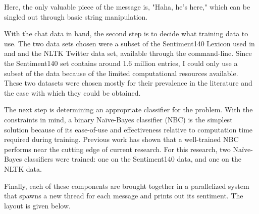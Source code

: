\documentclass[12pt]{article}
\begin{document}
Here, the only valuable piece of the message is, "Haha, he's here," which can be singled out through basic string manipulation. 

With the chat data in hand, the second step is to decide what training data to use. The two data sets chosen were a subset of the Sentiment140 Lexicon used in \cite{go2009twitter} and \cite{MohammadKZ2013} and the NLTK Twitter data set, available through the command-line. Since the Sentiment140 set contains around 1.6 million entries, I could only use a subset of the data because of the limited computational resources available. These two datasets were chosen mostly for their prevalence in the literature and the ease with which they could be obtained.

The next step is determining an appropriate classifier for the problem. With the constraints in mind, a binary Naïve-Bayes classifier (NBC) is the simplest solution because of its ease-of-use and effectiveness relative to computation time required during training. Previous work has shown that a well-trained NBC performs near the cutting edge of current research. For this research, two Naïve-Bayes classifiers were trained: one on the Sentiment140 data, and one on the NLTK data.

Finally, each of these components are brought together in a parallelized system that spawns a new thread for each message and prints out its sentiment. The layout is given below. 
\begin{center}
\end{center}
\end{document}
